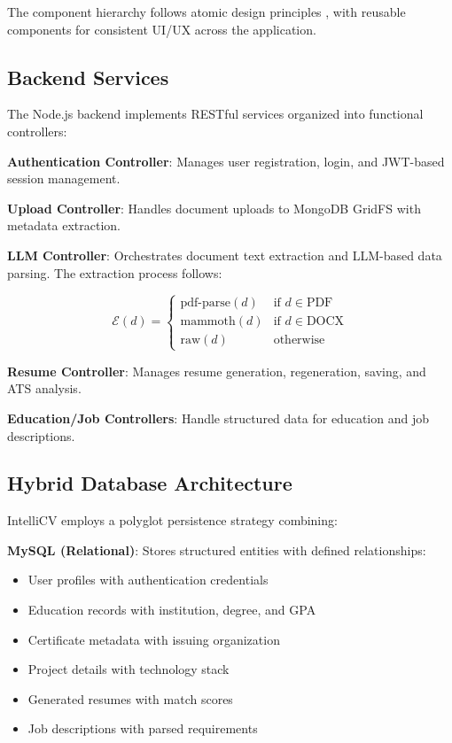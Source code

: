 \documentclass[conference]{IEEEtran}
\begin{document}
The component hierarchy follows atomic design principles \cite{frost2016atomic}, with reusable components for consistent UI/UX across the application.

\subsection{Backend Services}

The Node.js backend implements RESTful services organized into functional controllers:

\textbf{Authentication Controller}: Manages user registration, login, and JWT-based session management.

\textbf{Upload Controller}: Handles document uploads to MongoDB GridFS with metadata extraction.

\textbf{LLM Controller}: Orchestrates document text extraction and LLM-based data parsing. The extraction process follows:

\begin{equation}
\mathcal{E}(d) = \begin{cases}
\text{pdf-parse}(d) & \text{if } d \in \text{PDF} \\
\text{mammoth}(d) & \text{if } d \in \text{DOCX} \\
\text{raw}(d) & \text{otherwise}
\end{cases}
\label{eq:extraction}
\end{equation}

\textbf{Resume Controller}: Manages resume generation, regeneration, saving, and ATS analysis.

\textbf{Education/Job Controllers}: Handle structured data for education and job descriptions.

\subsection{Hybrid Database Architecture}

IntelliCV employs a polyglot persistence strategy combining:

\textbf{MySQL (Relational)}: Stores structured entities with defined relationships:
\begin{itemize}
    \item User profiles with authentication credentials
    \item Education records with institution, degree, and GPA
    \item Certificate metadata with issuing organization
    \item Project details with technology stack
    \item Generated resumes with match scores
    \item Job descriptions with parsed requirements
\end{itemize}
\end{document}
